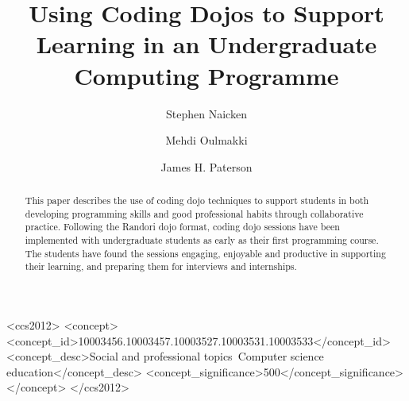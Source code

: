 \documentclass[sigconf]{acmart}
\begin{document}
\title{Using Coding Dojos to Support Learning in an Undergraduate Computing Programme}

\author{Stephen Naicken}

\author{Mehdi Oulmakki}

\author{James H. Paterson}


\renewcommand{\shortauthors}{}


\begin{abstract}
This paper describes the use of coding dojo techniques to support students in both developing programming skills and good professional habits through collaborative practice. Following the Randori dojo format, coding dojo sessions have been implemented with undergraduate students as early as their first programming course. The students have found the sessions engaging, enjoyable and productive in supporting their learning, and preparing them for interviews and internships.
\end{abstract}

%
%
\begin{CCSXML}
<ccs2012>
<concept>
<concept_id>10003456.10003457.10003527.10003531.10003533</concept_id>
<concept_desc>Social and professional topics~Computer science education</concept_desc>
<concept_significance>500</concept_significance>
</concept>
</ccs2012>
\end{CCSXML}





\maketitle





\end{document}
